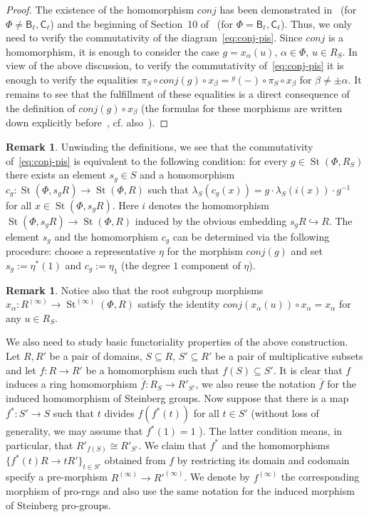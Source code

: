 \documentclass[oneside, 11pt]{amsart} \pdfoutput=1
\newcommand{\St}{\mathop{\mathrm{St}}\nolimits}
\numberwithin{equation}{section}
\theoremstyle{definition}
\newtheorem{rem}[lemma]{Remark}
\newcommand{\rB}{\mathsf{B}}
\newcommand{\rC}{\mathsf{C}}
\begin{document}
\begin{proof}
The existence of the homomorphism $conj$ has been demonstrated in~\cite[Proposition~4.2]{LSV20} (for $\Phi\neq\rB_\ell, \rC_\ell$) and the beginning of Section~10 of~\cite{V20} (for $\Phi=\rB_\ell, \rC_\ell$). Thus, we only need to verify the commutativity of the diagram~\eqref{eq:conj-pis}. 
Since $conj$ is a homomorphism, it is enough to consider the case $g = x_\alpha(u)$, $\alpha \in \Phi$, $u \in R_S$. In view of the above discussion, to verify the commutativity of~\eqref{eq:conj-pis} it is enough to verify the equalities $\pi_S \circ conj(g) \circ x_\beta= {}^g\!(-) \circ \pi_S \circ x_\beta$ for $\beta\neq \pm\alpha$.
 It remains to see that the fulfillment of these equalities is a direct consequence of the definition of $conj(g) \circ x_\beta$ (the formulas for these morphisms are written down explicitly before~\cite[Proposition~4.2]{LSV20}, cf. also~\cite[\S~10]{V20}). \end{proof}
\begin{rem} \label{rem:conj-action}
Unwinding the definitions, we see that the commutativity of~\eqref{eq:conj-pis} is equivalent to the following condition: for every $g\in \St(\Phi, R_S)$ there exists an element $s_g\in S$ and a homomorphism $c_g \colon \St(\Phi, s_g R) \to \St(\Phi, R)$ such that $\lambda_S(c_g(x)) = g \cdot \lambda_S(i(x))\cdot g^{-1}$ for all $x\in \St(\Phi, s_g R)$. Here $i$ denotes the homomorphism $\St(\Phi, s_g R) \to \St(\Phi, R)$ induced by the obvious embedding $s_gR \hookrightarrow R$. The element $s_g$ and the homomorphism $c_g$ can be determined via the following procedure: choose a representative $\eta$ for the morphism $conj(g)$ and set $s_g := \eta^*(1)$ and $c_g := \eta_1$ (the degree $1$ component of $\eta$).
\end{rem}

\begin{rem} \label{rem:conj-root-action}
 Notice also that the root subgroup morphisms $x_\alpha \colon R^{(\infty)} \to \St^{(\infty)}(\Phi, R)$ satisfy the identity $conj(x_\alpha(u)) \circ x_\alpha = x_\alpha$ for any $u \in R_S$.
\end{rem}

We also need to study basic functoriality properties of the above construction.
Let $R, R'$ be a pair of domains, $S \subseteq R$, $S' \subseteq R'$ be a pair of multiplicative subsets and let $f \colon R \to R'$ be a homomorphism such that $f(S)\subseteq S'$.
It is clear that $f$ induces a ring homomorphism $\overline{f}\colon R_S \to R'_{S'}$, we also reuse the notation $\overline{f}$ for the induced homomorphism of Steinberg groups.
Now suppose that there is a map $f^* \colon S' \to S$ such that $t$ divides $f(f^*(t))$ for all $t \in S'$ (without loss of generality, we may assume that $f^*(1)=1$ ). The latter condition means, in particular, that $R'_{f(S)} \cong R'_{S'}$. We claim that $f^*$ and the homomorphisms $\{f^*(t)R \to tR'\}_{t\in S'}$ obtained from $f$ by restricting its domain and codomain specify a pre-morphism $R^{(\infty)} \to R'^{(\infty)}$. We denote by $f^{(\infty)}$ the corresponding morphism of pro-rngs and also use the same notation for the induced morphism of Steinberg pro-groups.
\end{document}
